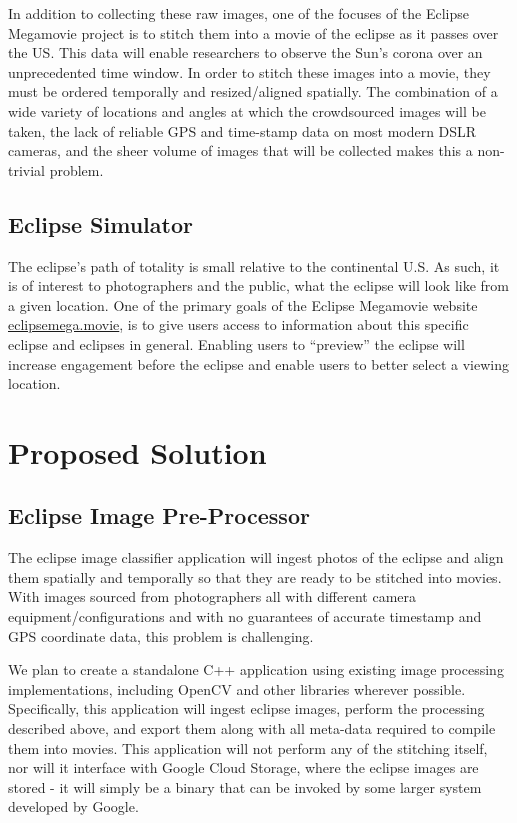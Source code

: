 \documentclass[10pt, onecolumn, draftclsnofoot, letterpaper]{IEEEtran}
\begin{document}
In addition to collecting these raw images, one of the focuses of the Eclipse
Megamovie project is to stitch them into a movie of the eclipse as it passes
over the US. This data will enable researchers to observe the Sun's corona over
an unprecedented time window. In order to stitch these images into a movie, they
must be ordered temporally and resized/aligned spatially. The combination of a
wide variety of locations and angles at which the crowdsourced images will be
taken, the lack of reliable GPS and time-stamp data on most modern DSLR cameras,
and the sheer volume of images that will be collected makes this a non-trivial
problem.

\subsection{Eclipse Simulator}

The eclipse's path of totality is small relative to the continental U.S. As
such, it is of interest to photographers and the public, what the eclipse will
look like from a given location. One of the primary goals of the Eclipse
Megamovie website \href{http://eclipsemega.movie}{eclipsemega.movie}, is to give
users access to information about this specific eclipse and eclipses in general.
Enabling users to “preview” the eclipse will increase engagement before the
eclipse and enable users to better select a viewing location.

\newpage

\section{Proposed Solution}

\subsection{Eclipse Image Pre-Processor}

The eclipse image classifier application will ingest photos of the eclipse and
align them spatially and temporally so that they are ready to be stitched into
movies. With images sourced from photographers all with different camera
equipment/configurations and with no guarantees of accurate timestamp and GPS
coordinate data, this problem is challenging.

We plan to create a standalone C++ application using existing image processing
implementations, including OpenCV and other libraries wherever possible.
Specifically, this application will ingest eclipse images, perform the
processing described above, and export them along with all meta-data required to
compile them into movies. This application will not perform any of the stitching
itself, nor will it interface with Google Cloud Storage, where the eclipse
images are stored - it will simply be a binary that can be invoked by some
larger system developed by Google.
\end{document}
